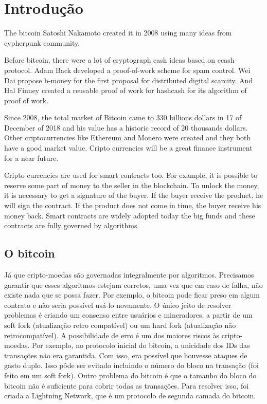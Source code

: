 \documentclass[12pt]{article}
\begin{document}
\tableofcontents
\pagebreak

\renewcommand{\thesection}{\arabic{section}}
\section{Introdução}

The bitcoin %
Satoshi Nakamoto created it in 2008 using many ideas from cypherpunk community.

Before bitcoin, there were a lot of cryptograph cash ideas based on ecash protocol.
Adam Back developed a proof-of-work scheme for spam control.
Wei Dai propose b-money for the first proposal for distributed digital scarcity.
And Hal Finney created a reusable proof of work for hashcash for its algorithm of proof of work.

Since 2008, the total market of Bitcoin came to 330 billions dollars in 17 of December of 2018
and his value has a historic record of 20 thousands dollars.
Other criptocurrencies like Ethereum and Monero were created and they both have a good market value.
Cripto currencies will be a great finance instrument for a near future.

Cripto currencies are used for smart contracts too.
For example, it is possible to reserve some part of money to the seller in the blockchain.
To unlock the money, it is necessary to get a signature of the buyer.
If the buyer receive the product, he will sign the contract.
If the product does not come in time, the buyer receive his money back.
Smart contracts are widely adopted today the big funds and
these contracts are fully governed by algorithms.

\subsection{O bitcoin}

Já que cripto-moedas são governadas integralmente por algoritmos.
Precisamos garantir que esses algoritmos estejam corretos, uma vez que em caso de falha,
não existe nada que se possa fazer. Por exemplo, o bitcoin pode ficar preso em algum contrato e não seria possível usá-lo novamente.
O único jeito de resolver problemas é criando um consenso entre usuários e mineradores,
a partir de um soft fork (atualização retro compatível) ou um hard fork (atualização não retrocompatível).
A possibilidade de erro é um dos maiores riscos às cripto-moedas.
Por exemplo, no protocolo inicial do bitcoin, a unicidade dos IDs das transações não era garantida.
Com isso, era possível que houvesse ataques de gasto duplo.
Isso pôde ser evitado incluindo o número do bloco na transação (foi feito em um soft fork).
Outro problema do bitcoin é que o tamanho do bloco do bitcoin não é suficiente para cobrir todas as transações.
Para resolver isso, foi criada a Lightning Network, que é um protocolo de segunda camada do bitcoin.
\end{document}
